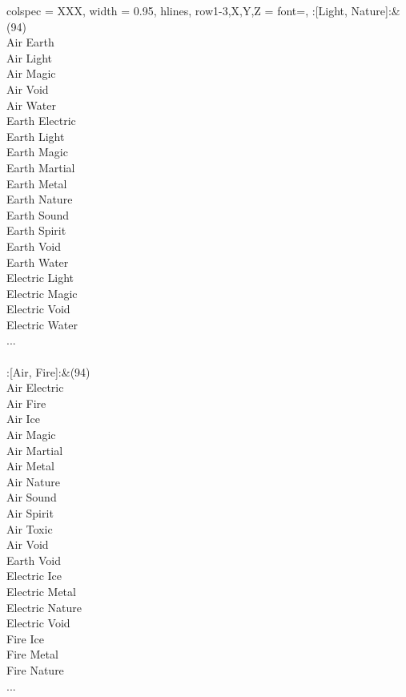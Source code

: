 \begin{longtblr}[
	caption = {2v2 Defending Weak},
	label = {2v2-Defending-Weak},
]{
	colspec = {XXX}, width = 0.95\linewidth,
	hlines,
	row{1-3,X,Y,Z} = {font=\bfseries},
}
	:[Light, Nature]:&{(94)\\
	Air Earth \\
	Air Light \\
	Air Magic \\
	Air Void \\
	Air Water \\
	Earth Electric \\
	Earth Light \\
	Earth Magic \\
	Earth Martial \\
	Earth Metal \\
	Earth Nature \\
	Earth Sound \\
	Earth Spirit \\
	Earth Void \\
	Earth Water \\
	Electric Light \\
	Electric Magic \\
	Electric Void \\
	Electric Water \\
	...\\
	}\\

	:[Air, Fire]:&{(94)\\
	Air Electric \\
	Air Fire \\
	Air Ice \\
	Air Magic \\
	Air Martial \\
	Air Metal \\
	Air Nature \\
	Air Sound \\
	Air Spirit \\
	Air Toxic \\
	Air Void \\
	Earth Void \\
	Electric Ice \\
	Electric Metal \\
	Electric Nature \\
	Electric Void \\
	Fire Ice \\
	Fire Metal \\
	Fire Nature \\
	...\\
	}\\


\end{longtblr}
